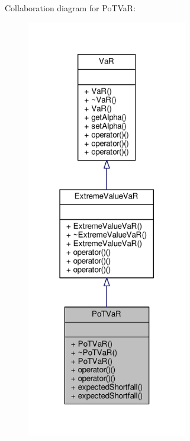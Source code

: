 Collaboration diagram for Po\+T\+VaR\+:
\nopagebreak
\begin{figure}[H]
\begin{center}
\leavevmode
\includegraphics[width=199pt]{classPoTVaR__coll__graph}
\end{center}
\end{figure}
